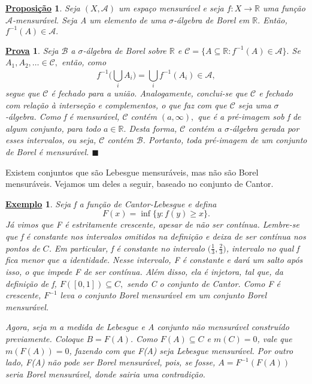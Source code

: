 \documentclass{article}
\newtheorem*{prop*}{\underline{Proposi\c c\~ao}}
\newtheorem{example}{\underline{Exemplo}}
\newtheorem*{proof*}{\underline{Prova}}
\renewcommand\qedsymbol{$\blacksquare$}
\begin{document}
\begin{prop*}
  Seja \((X, \mathcal{A})\) um espaço mensurável e seja \(f:X\rightarrow \mathbb{R}\) uma função \(\mathcal{A}\)-mensurável. Seja A um elemento de uma \(\sigma \)-álgebra de Borel em \(\mathbb{R}.\) Então, \(f^{-1}(A)\in \mathcal{A}.\)
\end{prop*}
\begin{proof*}
  Seja \(\mathcal{B}\) a \(\sigma \)-álgebra de Borel sobre \(\mathbb{R}\) e \(\mathcal{C} = \{A\subseteq \mathbb{R}: f^{-1}(A)\in \mathcal{A}\}.\) Se \(A_{1}, A_2,\dotsc \in \mathcal{C},\) então, como 
    \[
      f^{-1}\biggl(\bigcup_{i}^{}A_{i}\biggr) = \bigcup_{i}^{}f^{-1}(A_{i})\in \mathcal{A},
    \]
  segue que \(\mathcal{C}\) é fechado para a união. Analogamente, conclui-se que \(\mathcal{C}\) e fechado com relação à interseção e complementos, o que faz com que \(\mathcal{C}\) seja uma \(\sigma \)-álgebra. 
Como f é mensurável, \(\mathcal{C}\) contém \((a, \infty),\) que é a pré-imagem sob f de algum conjunto, para todo \(a\in \mathbb{R}.\) Desta forma, \(\mathcal{C}\) contém a \(\sigma \)-álgebra gerada por esses intervalos, 
ou seja, \(\mathcal{C}\) contém \(\mathcal{B}\). Portanto, toda pré-imagem de um conjunto de Borel é mensurável. \qedsymbol
\end{proof*}
  Existem conjuntos que são Lebesgue mensuráveis, mas não são Borel mensuráveis. Vejamos um deles a seguir, baseado no conjunto de Cantor.
\begin{example}
  Seja f a função de Cantor-Lebesgue e defina 
    \[
      F(x) = \inf_{}\{y: f(y)\geq x\}.
    \]
  Já vimos que F é estritamente crescente, apesar de não ser contínua. Lembre-se que f é constante nos intervalos omitidos na definição e deixa de ser contínua nos pontos de \(C\). Em particular, f é constante no intervalo 
  \(\biggl(\frac{1}{3}, \frac{2}{3}\biggr)\), intervalo no qual f fica menor que a identidade. Nesse intervalo, F é constante e dará um salto após isso, o que impede F de ser contínua. Além disso, ela é injetora, tal que, da definição de f, \(F([0, 1])\subseteq C,\) sendo C 
  o conjunto de Cantor. Como F é crescente, \(F^{-1}\) leva o conjunto Borel mensurável em um conjunto Borel mensurável. 

  Agora, seja m a medida de Lebesgue e A conjunto não mensurável construído previamente. Coloque \(B = F(A)\). Como \(F(A)\subseteq C\) e \(m(C) = 0\), 
vale que \(m(F(A)) = 0\), fazendo com que F(A) seja Lebesgue mensurável. Por outro lado, F(A) não pode ser Borel mensurável, pois, se fosse, \(A = F^{-1}(F(A))\) seria Borel mensurável, donde sairia uma contradição.
\end{example}
\end{document}
